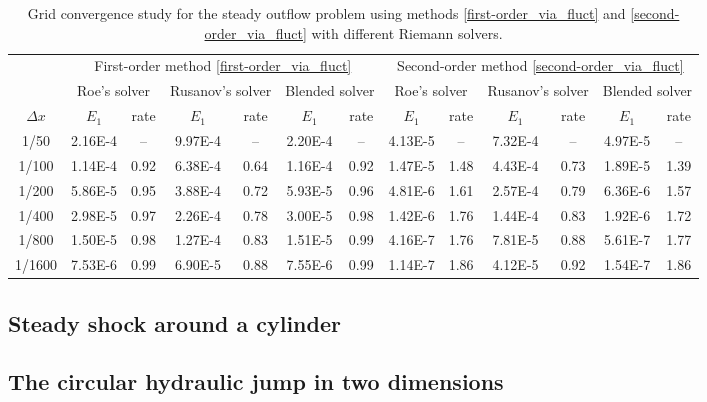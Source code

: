 \documentclass[preprint, 11pt]{article}
\begin{document}
\begin{table}[!ht]\scriptsize
  \begin{center}
    \begin{tabular}{||c||c|c||c|c||c|c||c|c||c|c||c|c||} \hline
      & \multicolumn{6}{c||}{First-order method \eqref{first-order_via_fluct}}
      & \multicolumn{6}{c||}{Second-order method \eqref{second-order_via_fluct}} \\ \cline{2-13}
      & \multicolumn{2}{c||}{Roe's solver}
      &\multicolumn{2}{c||}{Rusanov's solver}
      &\multicolumn{2}{c||}{Blended solver}
      & \multicolumn{2}{c||}{Roe's solver}
      &\multicolumn{2}{c||}{Rusanov's solver}
      &\multicolumn{2}{c||}{Blended solver}
      \\ \cline{2-13}
      $\Delta x$ & $E_1$ & rate & $E_1$ & rate & $E_1$ & rate & $E_1$ & rate & $E_1$ & rate & $E_1$ & rate\\ \hline
      1/50   & 2.16E-4 &  --  & 9.97E-4 &   -- & 2.20E-4 & --   & 4.13E-5 &   -- & 7.32E-4 &  --  & 4.97E-5 & --   \\
      1/100  & 1.14E-4 & 0.92 & 6.38E-4 & 0.64 & 1.16E-4 & 0.92 & 1.47E-5 & 1.48 & 4.43E-4 & 0.73 & 1.89E-5 & 1.39 \\
      1/200  & 5.86E-5 & 0.95 & 3.88E-4 & 0.72 & 5.93E-5 & 0.96 & 4.81E-6 & 1.61 & 2.57E-4 & 0.79 & 6.36E-6 & 1.57 \\
      1/400  & 2.98E-5 & 0.97 & 2.26E-4 & 0.78 & 3.00E-5 & 0.98 & 1.42E-6 & 1.76 & 1.44E-4 & 0.83 & 1.92E-6 & 1.72 \\
      1/800  & 1.50E-5 & 0.98 & 1.27E-4 & 0.83 & 1.51E-5 & 0.99 & 4.16E-7 & 1.76 & 7.81E-5 & 0.88 & 5.61E-7 & 1.77 \\
      1/1600 & 7.53E-6 & 0.99 & 6.90E-5 & 0.88 & 7.55E-6 & 0.99 & 1.14E-7 & 1.86 & 4.12E-5 & 0.92 & 1.54E-7 & 1.86 \\ \hline
    \end{tabular}
    \caption{Grid convergence study for the steady outflow problem
      using methods \eqref{first-order_via_fluct} and \eqref{second-order_via_fluct}
      with different Riemann solvers.\label{table:steady_outflow}}
  \end{center}
\end{table}

\subsection{Steady shock around a cylinder}\label{sec:bow_shock}
\subsection{The circular hydraulic jump in two dimensions}\label{sec:2D_chj}
\end{document}

